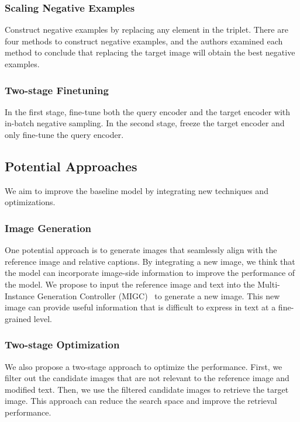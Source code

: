 \subsubsection{Scaling Negative Examples}
Construct negative examples by replacing any element in the triplet. There are four methods to construct negative examples, and the authors examined each method to conclude that replacing the target image will obtain the best negative examples.

\subsubsection{Two-stage Finetuning}
In the first stage, fine-tune both the query encoder and the target encoder with in-batch negative sampling. In the second stage, freeze the target encoder and only fine-tune the query encoder.

\subsection{Potential Approaches}
We aim to improve the baseline model by integrating new techniques and optimizations.

\subsubsection{Image Generation}
One potential approach is to generate images that seamlessly align with the reference image and relative captions. By integrating a new image, we think that the model can incorporate image-side information to improve the performance of the model. We propose to input the reference image and text into the Multi-Instance Generation Controller (MIGC)~\cite{zhou2024migc} to generate a new image. This new image can provide useful information that is difficult to express in text at a fine-grained level.

\subsubsection{Two-stage Optimization}
We also propose a two-stage approach to optimize the performance. First, we filter out the candidate images that are not relevant to the reference image and modified text. Then, we use the filtered candidate images to retrieve the target image. This approach can reduce the search space and improve the retrieval performance.
